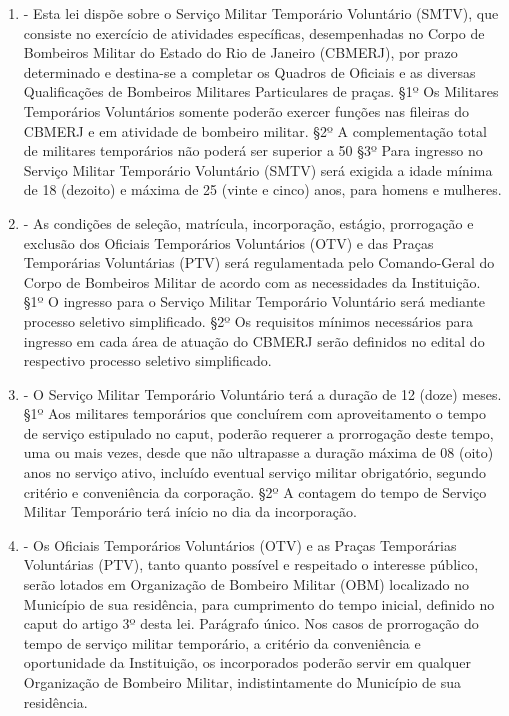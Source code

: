 \documentclass[10pt]{article}
\begin{document}
\begin{enumerate}[label=Art. \arabic*\textdegree]
\item - Esta lei dispõe sobre o Serviço Militar Temporário Voluntário (SMTV), que consiste no exercício de atividades específicas, desempenhadas no Corpo de Bombeiros Militar do Estado do Rio de Janeiro (CBMERJ), por prazo determinado e destina-se a completar os Quadros de Oficiais e as diversas Qualificações de Bombeiros Militares Particulares de praças. 
§1º Os Militares Temporários Voluntários somente poderão exercer funções nas fileiras do CBMERJ e em atividade  de bombeiro militar.
§2º A complementação total de militares temporários não poderá ser superior a 50%
§3º Para ingresso no Serviço Militar Temporário Voluntário (SMTV) será exigida a idade mínima de 18 (dezoito) e máxima de 25 (vinte e cinco) anos, para homens e mulheres.
\item - As condições de seleção, matrícula, incorporação, estágio, prorrogação e exclusão dos Oficiais Temporários Voluntários (OTV) e das Praças Temporárias Voluntárias (PTV) será regulamentada pelo Comando-Geral do Corpo de Bombeiros Militar de acordo com as necessidades da Instituição.
§1º O ingresso para o Serviço Militar Temporário Voluntário será mediante processo seletivo simplificado.
§2º Os requisitos mínimos necessários para ingresso em cada área de atuação do CBMERJ serão definidos no edital do respectivo processo seletivo simplificado.
\item - O Serviço Militar Temporário Voluntário terá a duração de 12 (doze) meses.
§1º Aos militares temporários que concluírem com aproveitamento o tempo de serviço estipulado no caput, poderão requerer a prorrogação deste tempo, uma ou mais vezes, desde que não ultrapasse a duração máxima de 08 (oito) anos no serviço ativo, incluído eventual serviço militar obrigatório, segundo critério e conveniência da corporação.
§2º A contagem do tempo de Serviço Militar Temporário terá início no dia da incorporação.
\item - Os Oficiais Temporários Voluntários (OTV) e as Praças Temporárias Voluntárias (PTV), tanto quanto possível e respeitado o interesse público, serão lotados em Organização de Bombeiro Militar (OBM) localizado no Município de sua residência, para cumprimento do tempo inicial, definido no caput do artigo 3º desta lei.
Parágrafo único. Nos casos de prorrogação do tempo de serviço militar temporário, a critério da conveniência e oportunidade da Instituição, os incorporados poderão servir em qualquer Organização de Bombeiro Militar, indistintamente do Município de sua residência.

\end{enumerate}
\end{document}

